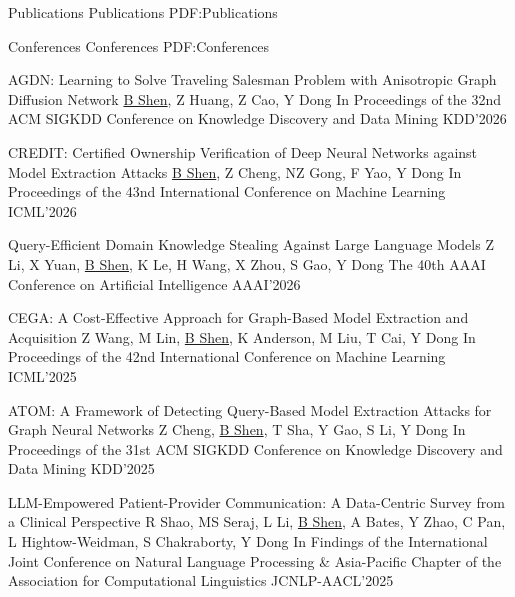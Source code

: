 \Section
{Publications}
{Publications}
{PDF:Publications}


\BigGap
\SubSection
{Conferences}
{Conferences}
{PDF:Conferences}

\begingroup
\renewcommand{\MaxNumberedItem}{[99]}

\BigGap
\NumberedItem{[8]}
{\PaperEntry
    {AGDN: Learning to Solve Traveling Salesman Problem with Anisotropic Graph Diffusion Network}
    {\underline{B Shen}, Z Huang, Z Cao, Y Dong}
    {In Proceedings of the 32nd ACM SIGKDD Conference on Knowledge Discovery and Data Mining}
    {KDD'2026}
    {}
}

\BigGap
\NumberedItem{[7]}
{\PaperEntry
    {CREDIT: Certified Ownership Verification of Deep Neural Networks against Model Extraction Attacks}
    {\underline{B Shen}, Z Cheng, NZ Gong, F Yao, Y Dong}
    {In Proceedings of the 43nd International Conference on Machine Learning}
    {ICML'2026}
    {}
}

\BigGap
\NumberedItem{[6]}
{\PaperEntry
    {Query-Efficient Domain Knowledge Stealing Against Large Language Models}
    {Z Li, X Yuan, \underline{B Shen}, K Le, H Wang, X Zhou, S Gao, Y Dong }
    {The 40th AAAI Conference on Artificial Intelligence}
    {AAAI'2026}
    {}
}

\BigGap
\NumberedItem{[5]}
{\PaperEntry
    {CEGA: A Cost-Effective Approach for Graph-Based Model Extraction and Acquisition}
    {Z Wang, M Lin, \underline{B Shen}, K Anderson, M Liu, T Cai, Y Dong}
    {In Proceedings of the 42nd International Conference on Machine Learning}
    {ICML'2025}
    {}
}

\BigGap
\NumberedItem{[4]}
{\PaperEntry
    {ATOM: A Framework of Detecting Query-Based Model Extraction Attacks for Graph Neural Networks}
    {Z Cheng, \underline{B Shen}, T Sha, Y Gao, S Li, Y Dong}
    {In Proceedings of the 31st ACM SIGKDD Conference on Knowledge Discovery and Data Mining}
    {KDD'2025}
    {}
}

\BigGap
\NumberedItem{[3]}
{\PaperEntry
    {LLM-Empowered Patient-Provider Communication: A Data-Centric Survey from a Clinical Perspective}
    {R Shao, MS Seraj, L Li, \underline{B Shen}, A Bates, Y Zhao, C Pan, L Hightow-Weidman, S Chakraborty, Y Dong}
    {In Findings of the International Joint Conference on Natural Language Processing \& Asia-Pacific Chapter of the Association for Computational Linguistics}
    {JCNLP-AACL'2025}
    {}
}

